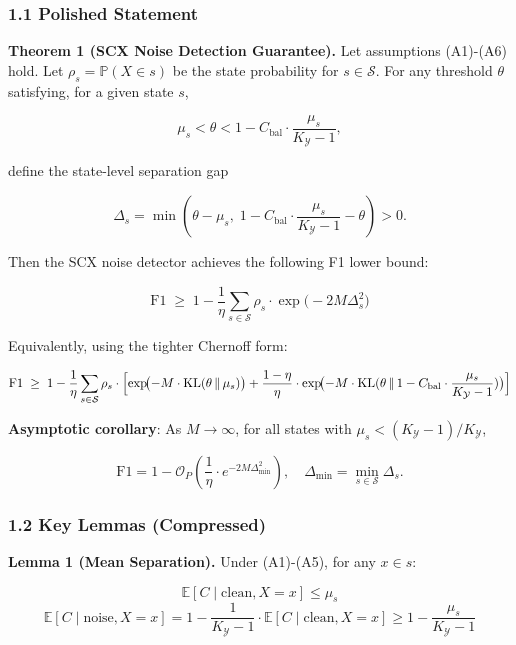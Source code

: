 \documentclass[
  12pt,
]{ctexart}
\begin{document}
\subsubsection{1.1 Polished Statement}\label{polished-statement}

\textbf{Theorem 1 (SCX Noise Detection Guarantee).} Let assumptions
(A1)-(A6) hold. Let \(\rho_s = \mathbb{P}(X \in s)\) be the state
probability for \(s \in \mathcal{S}\). For any threshold \(\theta\)
satisfying, for a given state \(s\),

\[\mu_s < \theta < 1 - C_{\text{bal}} \cdot \frac{\mu_s}{K_{\mathcal{Y}}-1},\]

define the state-level separation gap

\[\Delta_s = \min\!\left(\theta - \mu_s,\; 1 - C_{\text{bal}} \cdot \frac{\mu_s}{K_{\mathcal{Y}}-1} - \theta\right) > 0.\]

Then the SCX noise detector achieves the following F1 lower bound:

\[\boxed{\;\text{F1} \;\geq\; 1 - \frac{1}{\eta} \sum_{s \in \mathcal{S}} \rho_s \cdot \exp\!\bigl(-2M\Delta_s^2\bigr)\;}\]

Equivalently, using the tighter Chernoff form:

\[\text{F1} \;\geq\; 1 - \frac{1}{\eta} \sum_{s \in \mathcal{S}} \rho_s \cdot \Bigl[ \exp\!\bigl(-M \cdot \text{KL}(\theta \,\|\, \mu_s)\bigr) + \frac{1-\eta}{\eta} \cdot \exp\!\bigl(-M \cdot \text{KL}(\theta \,\|\, 1 - C_{\text{bal}} \cdot \frac{\mu_s}{K_{\mathcal{Y}}-1})\bigr) \Bigr]\]

\textbf{Asymptotic corollary}: As \(M \to \infty\), for all states with
\(\mu_s < (K_{\mathcal{Y}}-1)/K_{\mathcal{Y}}\),

\[\text{F1} = 1 - \mathcal{O}_P\!\left(\frac{1}{\eta} \cdot e^{-2M\Delta_{\min}^2}\right), \quad \Delta_{\min} = \min_{s \in \mathcal{S}} \Delta_s.\]

\subsubsection{1.2 Key Lemmas (Compressed)}\label{key-lemmas-compressed}

\textbf{Lemma 1 (Mean Separation).} Under (A1)-(A5), for any
\(x \in s\):

\[\mathbb{E}[C \mid \text{clean}, X = x] \leq \mu_s\]
\[\mathbb{E}[C \mid \text{noise}, X = x] = 1 - \frac{1}{K_{\mathcal{Y}}-1} \cdot \mathbb{E}[C \mid \text{clean}, X = x] \geq 1 - \frac{\mu_s}{K_{\mathcal{Y}}-1}\]
\end{document}
